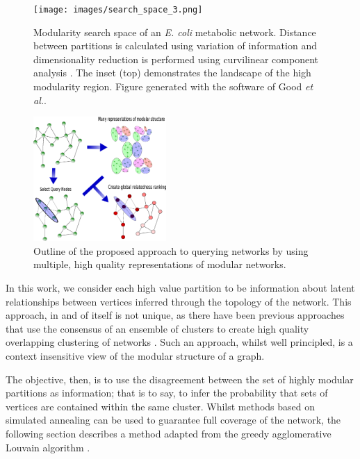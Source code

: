 \documentclass[sigconf]{acmart}
\begin{document}
\begin{figure}[ht]
    \texttt{[image: images/search\_space\_3.png]}
    \caption{Modularity search space of an \textit{E. coli} metabolic network.
 Distance between partitions is calculated using variation of information \cite{meilua2003comparing} and dimensionality reduction is performed using curvilinear component analysis \cite{demartines1997curvilinear}.
  The inset (top) demonstrates the landscape of the high modularity region. 
  Figure generated with the software of Good \textit{et al.}\cite{good2010performance}.}
    \label{fig:modular_search_space}
\end{figure}

\begin{figure}[ht]
    \centering
    \includegraphics[width=0.45\textwidth]{images/meth_fig/fig1_desc.eps}
    \caption{Outline of the proposed approach to querying networks by using multiple, high quality representations of modular networks.}
    \label{fig:algorithm_outline}
\end{figure}

In this work, we consider each high value partition to be information about latent relationships between vertices inferred through the topology of the network.
This approach, in and of itself is not unique, as there have been previous approaches that use the consensus of an ensemble of clusters to create high quality overlapping clustering of networks \cite{lancichinetti2012consensus}.
Such an approach, whilst well principled, is a context insensitive view of the modular structure of a graph.

The objective, then, is to use the disagreement between the set of highly modular partitions as information; that is to say, to infer the probability that sets of vertices are contained within the same cluster.
Whilst methods based on simulated annealing can be used to guarantee full coverage of the network, the following section describes a method adapted from the greedy agglomerative Louvain algorithm \cite{blondel2008fast}.
\end{document}
